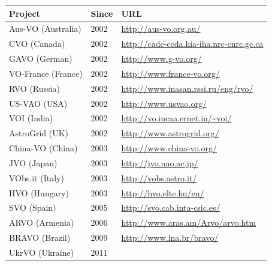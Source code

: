 \scriptsize
\begin{table}[h]
\centering
\begin{tabular}{|l|l|l|}
	\hline
	\textbf{Project} & \textbf{Since} & %
\textbf{URL} \\
	\hline
	Aus-VO (Australia) & 2002 & %
		\url{http://aus-vo.org.au/} \\
	\hline
   CVO (Canada) & 2002 & %
   	\url{http://cadc-ccda.hia-iha.nrc-cnrc.gc.ca} \\
	\hline
	GAVO (German) & 2002 & %
		\url{http://www.g-vo.org/} \\
	\hline
	VO-France (France) & 2002 & %
		\url{http://www.france-vo.org/} \\
	\hline
	RVO (Russia) & 2002 & %
		\url{http://www.inasan.rssi.ru/eng/rvo/} \\
	\hline
	US-VAO (USA) & 2002 & %
		 \url{http://www.usvao.org/} \\
	\hline
	VOI (India) & 2002 & %
		\url{http://vo.iucaa.ernet.in/~voi/} \\
	\hline
	AstroGrid (UK) & 2002 & %
		\url{http://www.astrogrid.org/} \\
	\hline
   China-VO (China) & 2003 & %
   \url{http://www.china-vo.org/} \\
	\hline
	JVO (Japan) & 2003 &%
		\url{http://jvo.nao.ac.jp/}\\
	\hline
	VObs.it (Italy) & 2003 & %
		\url{http://vobs.astro.it/} \\
	\hline
	HVO (Hungary) & 2003 & %
 		\url{http://hvo.elte.hu/en/} \\
	\hline
	SVO (Spain) & 2005 & %
		\url{http://svo.cab.inta-csic.es/} \\
	\hline
	ARVO (Armenia) & 2006 & %
		\url{http://www.aras.am/Arvo/arvo.htm} \\
	\hline
	BRAVO (Brazil) & 2009 & %
		\url{http://www.lna.br/bravo/} \\
	\hline
	UkrVO (Ukraine) & 2011 & %

\end{tabular}
\end{table}
